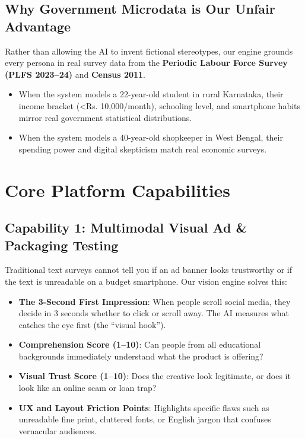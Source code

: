 \documentclass[11pt,a4paper]{article}
\begin{document}
\subsection{Why Government Microdata is Our Unfair Advantage}
Rather than allowing the AI to invent fictional stereotypes, our engine grounds every persona in real survey data from the \textbf{Periodic Labour Force Survey (PLFS 2023--24)} and \textbf{Census 2011}. 
\begin{itemize}[noitemsep]
  \item When the system models a 22-year-old student in rural Karnataka, their income bracket (<Rs. 10,000/month), schooling level, and smartphone habits mirror real government statistical distributions.
  \item When the system models a 40-year-old shopkeeper in West Bengal, their spending power and digital skepticism match real economic surveys.
\end{itemize}

\newpage
\section{Core Platform Capabilities}

\subsection{Capability 1: Multimodal Visual Ad \& Packaging Testing}
Traditional text surveys cannot tell you if an ad banner looks trustworthy or if the text is unreadable on a budget smartphone. Our vision engine solves this:
\begin{itemize}[noitemsep]
  \item \textbf{The 3-Second First Impression}: When people scroll social media, they decide in 3 seconds whether to click or scroll away. The AI measures what catches the eye first (the ``visual hook'').
  \item \textbf{Comprehension Score (1--10)}: Can people from all educational backgrounds immediately understand what the product is offering?
  \item \textbf{Visual Trust Score (1--10)}: Does the creative look legitimate, or does it look like an online scam or loan trap?
  \item \textbf{UX and Layout Friction Points}: Highlights specific flaws such as unreadable fine print, cluttered fonts, or English jargon that confuses vernacular audiences.
\end{itemize}
\end{document}
